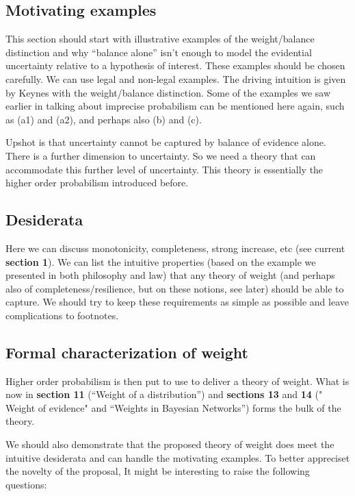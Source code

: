 \documentclass[
  10pt,
  dvipsnames,enabledeprecatedfontcommands]{scrartcl}
\begin{document}
\hypertarget{motivating-examples}{%
\subsection{Motivating examples}\label{motivating-examples}}

This section should start with illustrative examples of the
weight/balance distinction and why ``balance alone'' isn't enough to
model the evidential uncertainty relative to a hypothesis of interest.
These examples should be chosen carefully. We can use legal and
non-legal examples. The driving intuition is given by Keynes with the
weight/balance distinction. Some of the examples we saw earlier in
talking about imprecise probabilism can be mentioned here again, such as
(a1) and (a2), and perhaps also (b) and (c).

Upshot is that uncertainty cannot be captured by balance of evidence
alone. There is a further dimension to uncertainty. So we need a theory
that can accommodate this further level of uncertainty. This theory is
essentially the higher order probabilism introduced before.

\hypertarget{desiderata}{%
\subsection{Desiderata}\label{desiderata}}

Here we can discuss monotonicity, completeness, strong increase, etc
(see current \textbf{section 1}). We can list the intuitive properties
(based on the example we presented in both philosophy and law) that any
theory of weight (and perhaps also of completeness/resilience, but on
these notions, see later) should be able to capture. We should try to
keep these requirements as simple as possible and leave complications to
footnotes.

\hypertarget{formal-characterization-of-weight}{%
\subsection{Formal characterization of
weight}\label{formal-characterization-of-weight}}

Higher order probabilism is then put to use to deliver a theory of
weight. What is now in \textbf{section 11} (``Weight of a
distribution'') and \textbf{sections 13} and \textbf{14} (" Weight of
evidence" and ``Weights in Bayesian Networks'') forms the bulk of the
theory.

We should also demonstrate that the proposed theory of weight does meet
the intuitive desiderata and can handle the motivating examples. To
better appreciset the novelty of the proposal, It might be interesting
to raise the following questions:
\end{document}

